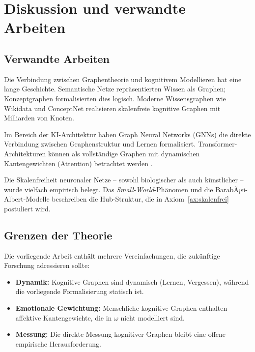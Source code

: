 ﻿\documentclass[12pt,a4paper]{article}
\theoremstyle{plain}
\theoremstyle{definition}
\theoremstyle{remark}
\begin{document}
\section{Diskussion und verwandte Arbeiten}
\label{sec:diskussion}

\subsection{Verwandte Arbeiten}

Die Verbindung zwischen Graphentheorie und kognitivem Modellieren hat eine lange Geschichte. Semantische Netze \cite{Quillian1968} repräsentierten Wissen als Graphen; Konzeptgraphen \cite{Sowa1984} formalisierten dies logisch. Moderne Wissensgraphen wie Wikidata und ConceptNet realisieren skalenfreie kognitive Graphen mit Milliarden von Knoten.

Im Bereich der KI-Architektur haben Graph Neural Networks (GNNs) die direkte Verbindung zwischen Graphenstruktur und Lernen formalisiert. Transformer-Architekturen können als vollständige Graphen mit dynamischen Kantengewichten (Attention) betrachtet werden \cite{Vaswani2017}.

Die Skalenfreiheit neuronaler Netze -- sowohl biologischer als auch künstlicher -- wurde vielfach empirisch belegt. Das \emph{Small-World}-Phänomen und die BarabÃ¡si-Albert-Modelle \cite{Barabasi1999} beschreiben die Hub-Struktur, die in Axiom~\ref{ax:skalenfrei} postuliert wird.

\subsection{Grenzen der Theorie}

Die vorliegende Arbeit enthält mehrere Vereinfachungen, die zukünftige Forschung adressieren sollte:

\begin{itemize}
  \item \textbf{Dynamik:} Kognitive Graphen sind dynamisch (Lernen, Vergessen), während die vorliegende Formalisierung statisch ist.
  \item \textbf{Emotionale Gewichtung:} Menschliche kognitive Graphen enthalten affektive Kantengewichte, die in $\omega$ nicht modelliert sind.
  \item \textbf{Messung:} Die direkte Messung kognitiver Graphen bleibt eine offene empirische Herausforderung.
\end{itemize}
\end{document}

